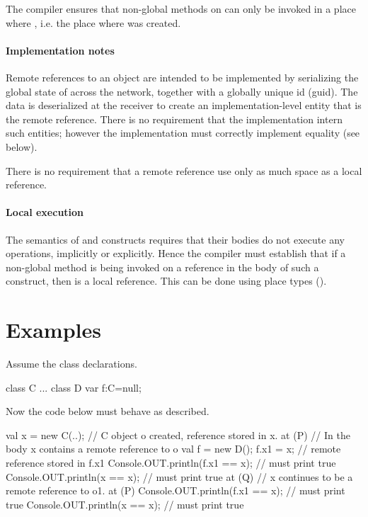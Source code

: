 The \Xten{} compiler ensures that non-global methods on  can
only be invoked in a place where , i.e. the place
where  was created.

\paragraph{Implementation notes}
Remote references to an object  are intended to be implemented
by serializing the global state of  across the network,
together with a globally unique id (guid). The data is deserialized at
the receiver to create an implementation-level entity that is the
remote reference. There is no requirement that the implementation
intern such entities; however the implementation must correctly
implement equality (see below).

There is no requirement that a remote reference use only as much space as a local reference.

  
\paragraph{Local execution}
 The semantics of  and  constructs requires that their
 bodies do not execute any  operations, implicitly or
 explicitly. Hence the compiler must establish that if a non-global method
 is being invoked on a reference  in the body of such a construct,
 then  is a local reference. This can be done using place types ().

  
\section{Examples}
Assume the class declarations. 

\begin{xten}
class C { ...} 
class D {
   var f:C=null;
}
\end{xten}
 
Now the code below must behave as described.
\begin{xten}
val x = new C(..); 
// C object o created, reference stored in x. 
at (P) { 
      // In the body x contains a remote reference to o
      val f = new D();
      f.x1  = x; // remote reference stored in f.x1
      Console.OUT.println(f.x1 == x);       // must print true
      Console.OUT.println(x == x);          // must print true
      at (Q) { 
         // x continues to be a remote reference to o1.
         at (P) {  
             Console.OUT.println(f.x1 == x);   // must print true
             Console.OUT.println(x == x);   // must print true
         }
      }
}
\end{xten}
  

